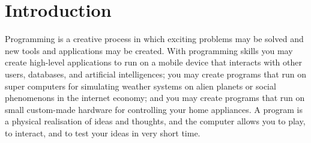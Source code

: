\chapter{Introduction}
Programming is a creative process in which exciting problems may be solved and new tools and applications may be created. With programming skills you may create high-level applications to run on a mobile device that interacts with other users, databases, and artificial intelligences; you may create programs that run on super computers for simulating weather systems on alien planets or social phenomenons in the internet economy; and you may create programs that run on small custom-made hardware for controlling your home appliances. A program is a physical realisation of ideas and thoughts, and the computer allows you to play, to interact, and to test your ideas in very short time.

